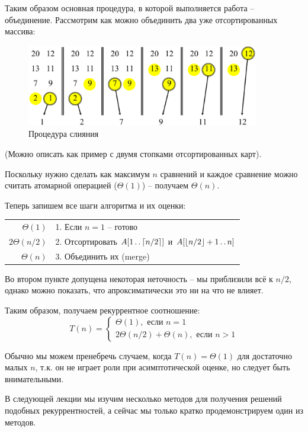 \documentclass[11pt]{article}
\begin{document}
Таким образом основная процедура, в которой выполняется работа -- объединение.
Рассмотрим как можно объединить два уже отсортированных массива:

\begin{figure}[ht]
  \centering
  \includegraphics[width=4in]{lecture1/merge.eps}
  \caption{Процедура слияния}
  \label{fig:merge}
\end{figure}

(Можно описать как пример с двумя стопками отсортированных карт).

Поскольку нужно сделать как максимум $n$ сравнений и каждое сравнение можно
считать атомарной операцией ($\Theta(1)$) -- получаем $\Theta(n)$.

Теперь запишем все шаги алгоритма и их оценки:

\begin{tabular}{|r|l|}
$\Theta(1)$    & 1. Если $n = 1$ -- готово  \\
$2\Theta(n/2)$ & 2. Отсортировать $A[1 \mathinner{\ldotp\ldotp} \lceil n/2 \rceil]$ и $A[\lfloor
                    n/2 \rfloor+1 \mathinner{\ldotp\ldotp} n]$ \\
$\Theta(n)$    & 3. Объединить их (merge) 
\end{tabular}

Во втором пункте допущена некоторая неточность -- мы приблизили всё к $n/2$,
однако можно показать, что апроксиматически это ни на что не влияет.

Таким образом, получаем рекуррентное соотношение:
\begin{equation}
  T(n) = \begin{cases}
    \Theta(1), \text{ если } n = 1 \\
    2\Theta(n/2) + \Theta(n), \text{ если } n > 1
    \end{cases}
  \label{eq:recur}
\end{equation}

Обычно мы можем пренебречь случаем, когда $T(n) = \Theta(1)$ для достаточно
малых $n$, т.к. он не играет роли при асимптотической оценке, но следует быть
внимательными.

В следующей лекции мы изучим несколько методов для получения решений подобных
рекуррентностей, а сейчас мы только кратко продемонстрируем один из методов.
\end{document}
